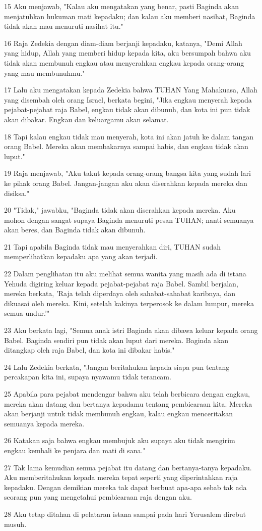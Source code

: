 \par 15 Aku menjawab, "Kalau aku mengatakan yang benar, pasti Baginda akan menjatuhkan hukuman mati kepadaku; dan kalau aku memberi nasihat, Baginda tidak akan mau menuruti nasihat itu."
\par 16 Raja Zedekia dengan diam-diam berjanji kepadaku, katanya, "Demi Allah yang hidup, Allah yang memberi hidup kepada kita, aku bersumpah bahwa aku tidak akan membunuh engkau atau menyerahkan engkau kepada orang-orang yang mau membunuhmu."
\par 17 Lalu aku mengatakan kepada Zedekia bahwa TUHAN Yang Mahakuasa, Allah yang disembah oleh orang Israel, berkata begini, "Jika engkau menyerah kepada pejabat-pejabat raja Babel, engkau tidak akan dibunuh, dan kota ini pun tidak akan dibakar. Engkau dan keluargamu akan selamat.
\par 18 Tapi kalau engkau tidak mau menyerah, kota ini akan jatuh ke dalam tangan orang Babel. Mereka akan membakarnya sampai habis, dan engkau tidak akan luput."
\par 19 Raja menjawab, "Aku takut kepada orang-orang bangsa kita yang sudah lari ke pihak orang Babel. Jangan-jangan aku akan diserahkan kepada mereka dan disiksa."
\par 20 "Tidak," jawabku, "Baginda tidak akan diserahkan kepada mereka. Aku mohon dengan sangat supaya Baginda menuruti pesan TUHAN; nanti semuanya akan beres, dan Baginda tidak akan dibunuh.
\par 21 Tapi apabila Baginda tidak mau menyerahkan diri, TUHAN sudah memperlihatkan kepadaku apa yang akan terjadi.
\par 22 Dalam penglihatan itu aku melihat semua wanita yang masih ada di istana Yehuda digiring keluar kepada pejabat-pejabat raja Babel. Sambil berjalan, mereka berkata, 'Raja telah diperdaya oleh sahabat-sahabat karibnya, dan dikuasai oleh mereka. Kini, setelah kakinya terperosok ke dalam lumpur, mereka semua undur.'"
\par 23 Aku berkata lagi, "Semua anak istri Baginda akan dibawa keluar kepada orang Babel. Baginda sendiri pun tidak akan luput dari mereka. Baginda akan ditangkap oleh raja Babel, dan kota ini dibakar habis."
\par 24 Lalu Zedekia berkata, "Jangan beritahukan kepada siapa pun tentang percakapan kita ini, supaya nyawamu tidak terancam.
\par 25 Apabila para pejabat mendengar bahwa aku telah berbicara dengan engkau, mereka akan datang dan bertanya kepadamu tentang pembicaraan kita. Mereka akan berjanji untuk tidak membunuh engkau, kalau engkau menceritakan semuanya kepada mereka.
\par 26 Katakan saja bahwa engkau membujuk aku supaya aku tidak mengirim engkau kembali ke penjara dan mati di sana."
\par 27 Tak lama kemudian semua pejabat itu datang dan bertanya-tanya kepadaku. Aku memberitahukan kepada mereka tepat seperti yang diperintahkan raja kepadaku. Dengan demikian mereka tak dapat berbuat apa-apa sebab tak ada seorang pun yang mengetahui pembicaraan raja dengan aku.
\par 28 Aku tetap ditahan di pelataran istana sampai pada hari Yerusalem direbut musuh.

